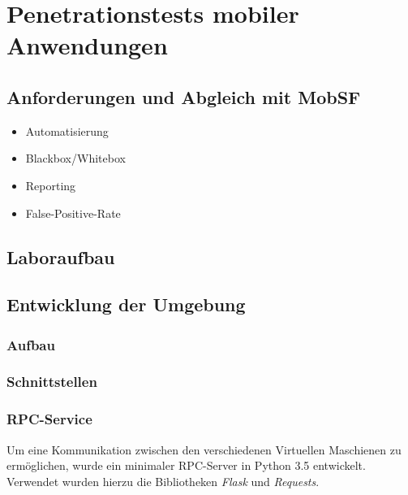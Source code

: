 \chapter{Penetrationstests mobiler Anwendungen}


	


	\section{Anforderungen und Abgleich mit MobSF}
	\begin{itemize}
		\item Automatisierung
		\item Blackbox/Whitebox
		\item Reporting
		\item False-Positive-Rate
	\end{itemize}

	\section{Laboraufbau}
	\section{Entwicklung der Umgebung}
		\subsection{Aufbau}
		\subsection{Schnittstellen}
		\subsection{RPC-Service}
Um eine Kommunikation zwischen den verschiedenen Virtuellen Maschienen zu ermöglichen, wurde ein minimaler RPC-Server in Python 3.5 entwickelt. Verwendet wurden hierzu die Bibliotheken \textit{Flask} und \textit{Requests}.

